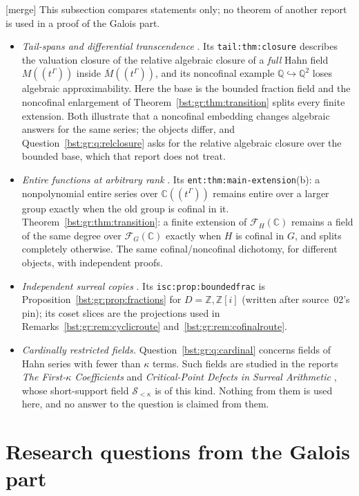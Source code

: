 \documentclass[11pt,letterpaper]{article}
\theoremstyle{definition}
\theoremstyle{remark}
\newcommand{\Q}{\mathbb Q}
\newcommand{\C}{\mathbb C}
\newcommand{\Z}{\mathbb Z}
\newcommand{\FF}[2]{\mathcal F_{#2}(#1)}
\begin{document}
\textup{[merge]} This subsection compares statements only; no theorem of
another report is used in a proof of the Galois part.
\begin{itemize}
\item \emph{Tail-spans and differential transcendence} \cite{RepoTail}. Its
\texttt{tail:thm:closure} describes the valuation closure of the relative
algebraic closure of a \emph{full} Hahn field $M((t^\Gamma))$ inside
$\overline M((t^\Gamma))$, and its noncofinal example $\Q\hookrightarrow\Q^2$
loses algebraic approximability. Here the base is the bounded fraction field
and the noncofinal enlargement of Theorem~\ref{bst:gr:thm:transition} splits
every finite extension. Both illustrate that a noncofinal embedding changes
algebraic answers for the same series; the objects differ, and
Question~\ref{bst:gr:q:relclosure} asks for the relative algebraic closure over
the bounded base, which that report does not treat.
\item \emph{Entire functions at arbitrary rank} \cite{RepoEntire}. Its
\texttt{ent:thm:main-extension}(b): a nonpolynomial entire series over
$\C((t^\Gamma))$ remains entire over a larger group exactly when the old group
is cofinal in it. Theorem~\ref{bst:gr:thm:transition}: a finite extension of
$\FF{\C}H$ remains a field of the same degree over $\FF{\C}G$ exactly when $H$
is cofinal in $G$, and splits completely otherwise. The same cofinal/noncofinal
dichotomy, for different objects, with independent proofs.
\item \emph{Independent surreal copies} \cite{RepoIsc}. Its
\texttt{isc:prop:boundedfrac} is Proposition~\ref{bst:gr:prop:fractions} for
$D=\Z,\Z[i]$ (written after source~02's pin); its coset slices are the
projections used in Remarks~\ref{bst:gr:rem:cyclicroute}
and~\ref{bst:gr:rem:cofinalroute}.
\item \emph{Cardinally restricted fields.} Question~\ref{bst:gr:q:cardinal}
concerns fields of Hahn series with fewer than $\kappa$ terms. Such fields
are studied in the reports \emph{The First-$\kappa$ Coefficients}
\cite{RepoFkc} and \emph{Critical-Point Defects in Surreal Arithmetic}
\cite{RepoLce}, whose short-support field $\mathscr S_{<\kappa}$ is of this kind. Nothing from
them is used here, and no answer to the question is claimed from them.
\end{itemize}

\section{Research questions from the Galois part}\label{bst:gr:sec:questions}
\end{document}
